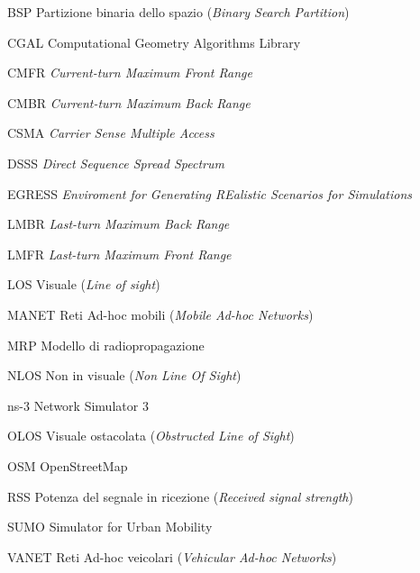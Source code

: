 \begin{abbreviations}

\item[BSP] Partizione binaria dello spazio (\textit{Binary Search Partition})
\item[CGAL] Computational Geometry Algorithms Library
\item[CMFR] \textit{Current-turn Maximum Front Range}
\item[CMBR] \textit{Current-turn Maximum Back Range}
\item[CSMA] \textit{Carrier Sense Multiple Access}
\item[DSSS] \textit{Direct Sequence Spread Spectrum}
\item[EGRESS] \textit{Enviroment for Generating REalistic Scenarios for Simulations}
\item[LMBR] \textit{Last-turn Maximum Back Range}
\item[LMFR] \textit{Last-turn Maximum Front Range}
\item[LOS] Visuale (\textit{Line of sight})
\item[MANET] Reti Ad-hoc mobili (\textit{Mobile Ad-hoc Networks})
\item[MRP] Modello di radiopropagazione
\item[NLOS] Non in visuale (\textit{Non Line Of Sight})
\item[ns-3] Network Simulator 3
\item[OLOS] Visuale ostacolata (\textit{Obstructed Line of Sight})
\item[OSM] OpenStreetMap
\item[RSS] Potenza del segnale in ricezione (\textit{Received signal strength})
\item[SUMO] Simulator for Urban Mobility
\item[VANET] Reti Ad-hoc veicolari (\textit{Vehicular Ad-hoc Networks})

\end{abbreviations}
